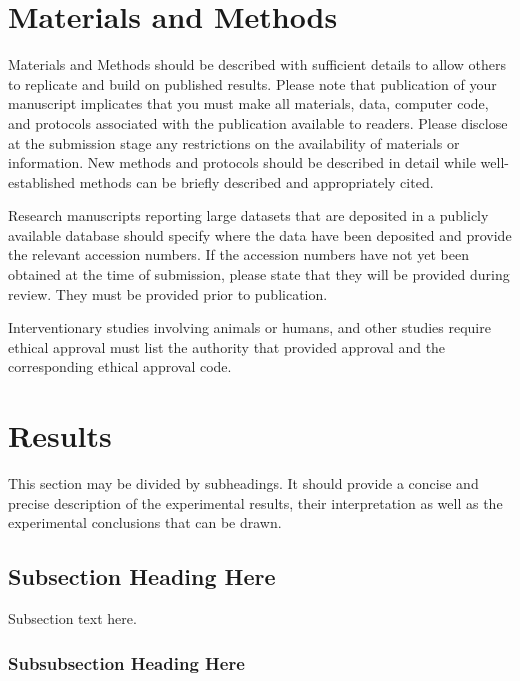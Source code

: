 \documentclass[water,article,submit,moreauthors,pdftex]{mdpi}
\begin{document}
\hypertarget{materials-and-methods}{%
\section{Materials and Methods}\label{materials-and-methods}}

Materials and Methods \citep{knight_automated_2020} should be described
with sufficient details to allow others to replicate and build on
published results. Please note that publication of your manuscript
implicates that you must make all materials, data, computer code, and
protocols associated with the publication available to readers. Please
disclose at the submission stage any restrictions on the availability of
materials or information. New methods and protocols should be described
in detail while well-established methods can be briefly described and
appropriately cited.\citep{kypraiou_what_2021}

Research manuscripts reporting large datasets that are deposited in a
publicly available database should specify where the data have been
deposited and provide the relevant accession numbers. If the accession
numbers have not yet been obtained at the time of submission, please
state that they will be provided during review. They must be provided
prior to publication.\citep{gebru_datasheets_2021}

Interventionary studies involving animals or humans, and other studies
require ethical approval must list the authority that provided approval
and the corresponding ethical approval code.

\hypertarget{results}{%
\section{Results}\label{results}}

This section may be divided by subheadings. It should provide a concise
and precise description of the experimental results, their
interpretation as well as the experimental conclusions that can be
drawn.\citep{barocas_fairness_nodate}

\hypertarget{subsection-heading-here}{%
\subsection{Subsection Heading Here}\label{subsection-heading-here}}

Subsection text here.

\hypertarget{subsubsection-heading-here}{%
\subsubsection{Subsubsection Heading
Here}\label{subsubsection-heading-here}}
\end{document}
